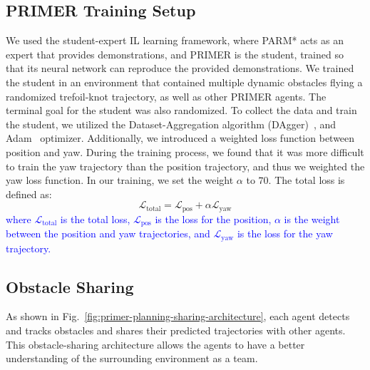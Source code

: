 \subsection{PRIMER Training Setup}
We used the student-expert IL learning framework, where PARM* acts as an expert that provides demonstrations, and PRIMER is the student, trained so that its neural network can reproduce the provided demonstrations. 
We trained the student in an environment that contained multiple dynamic obstacles flying a randomized trefoil-knot trajectory, as well as other PRIMER agents. The terminal goal for the student was also randomized. To collect the data and train the student, we utilized the Dataset-Aggregation algorithm (DAgger)~\cite{ross2011reduction}, and Adam~\cite{kingma2014adam} optimizer. Additionally, we introduced a weighted loss function between position and yaw. During the training process, we found that it was more difficult to train the yaw trajectory than the position trajectory, and thus we weighted the yaw loss function. In our training, we set the weight $\alpha$ to $70$. The total loss is defined as:
%
\begin{equation}
\mathcal{L}_\text{total} = \mathcal{L}_\text{pos} + \alpha \mathcal{L}_\text{yaw}
\end{equation}
%
\textcolor{blue}{where $\mathcal{L}_\text{total}$ is the total loss, $\mathcal{L}_\text{pos}$ is the loss for the position, $\alpha$ is the weight between the position and yaw trajectories, and $\mathcal{L}_\text{yaw}$ is the loss for the yaw trajectory.}

\subsection{Obstacle Sharing}
As shown in Fig.~\ref{fig:primer-planning-sharing-architecture}, each agent detects and tracks obstacles and shares their predicted trajectories with other agents. This obstacle-sharing architecture allows the agents to have a better understanding of the surrounding environment as a team.


